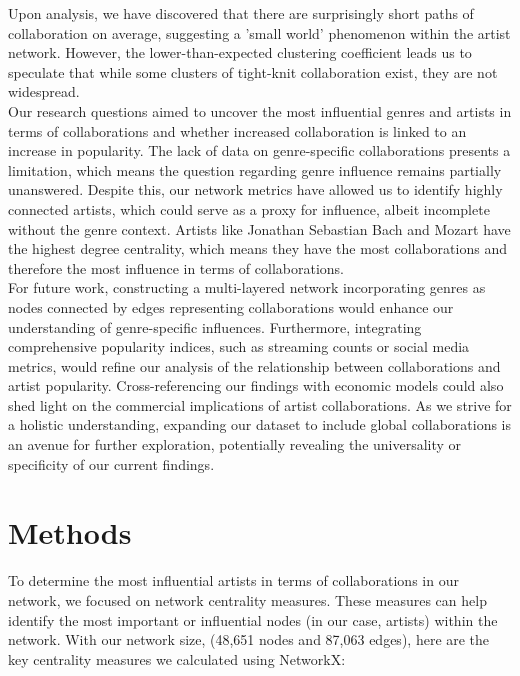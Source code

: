 \documentclass[12pt,a4paper]{article}
\begin{document}
Upon analysis, we have discovered that there are surprisingly short paths of collaboration on average, suggesting a 'small world' phenomenon within the artist network. However, the lower-than-expected clustering coefficient leads us to speculate that while some clusters of tight-knit collaboration exist, they are not widespread.\\

Our research questions aimed to uncover the most influential genres and artists in terms of collaborations and whether increased collaboration is linked to an increase in popularity. The lack of data on genre-specific collaborations presents a limitation, which means the question regarding genre influence remains partially unanswered. Despite this, our network metrics have allowed us to identify highly connected artists, which could serve as a proxy for influence, albeit incomplete without the genre context. Artists like Jonathan Sebastian Bach and Mozart have the highest degree centrality, which means they have the most collaborations and therefore the most influence in terms of collaborations. \\

For future work, constructing a multi-layered network incorporating genres as nodes connected by edges representing collaborations would enhance our understanding of genre-specific influences. Furthermore, integrating comprehensive popularity indices, such as streaming counts or social media metrics, would refine our analysis of the relationship between collaborations and artist popularity. Cross-referencing our findings with economic models could also shed light on the commercial implications of artist collaborations. As we strive for a holistic understanding, expanding our dataset to include global collaborations is an avenue for further exploration, potentially revealing the universality or specificity of our current findings.

\section{Methods}
To determine the most influential artists in terms of collaborations in our network, we focused on network centrality measures. These measures can help identify the most important or influential nodes (in our case, artists) within the network. With our network size, (48,651 nodes and 87,063 edges), here are the key centrality measures we calculated using NetworkX:\\
\end{document}

